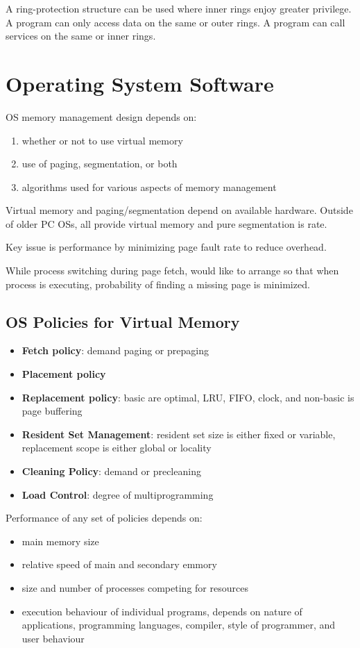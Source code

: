 \documentclass[11pt]{article}
\begin{document}
A ring-protection structure can be used where inner rings enjoy greater privilege.
A program can only access data on the same or outer rings.
A program can call services on the same or inner rings.
\section{Operating System Software}
\label{sec:org2430553}
OS memory management design depends on:
\begin{enumerate}
\item whether or not to use virtual memory
\item use of paging, segmentation, or both
\item algorithms used for various aspects of memory management
\end{enumerate}

Virtual memory and paging/segmentation depend on available hardware.
Outside of older PC OSs, all provide virtual memory and pure segmentation is rate.

Key issue is performance by minimizing page fault rate to reduce overhead.

While process switching during page fetch, would like to arrange so that when
process is executing, probability of finding a missing page is minimized.
\subsection{OS Policies for Virtual Memory}
\label{sec:org8fca0ac}
\begin{itemize}
\item \textbf{Fetch policy}: demand paging or prepaging
\item \textbf{Placement policy}
\item \textbf{Replacement policy}: basic are optimal, LRU, FIFO, clock, and non-basic is page
buffering
\item \textbf{Resident Set Management}: resident set size is either fixed or variable, replacement
scope is either global or locality
\item \textbf{Cleaning Policy}: demand or precleaning
\item \textbf{Load Control}: degree of multiprogramming
\end{itemize}

Performance of any set of policies depends on:
\begin{itemize}
\item main memory size
\item relative speed of main and secondary emmory
\item size and number of processes competing for resources
\item execution behaviour of individual programs, depends on nature of applications,
programming languages, compiler, style of programmer, and user behaviour
\end{itemize}
\end{document}
